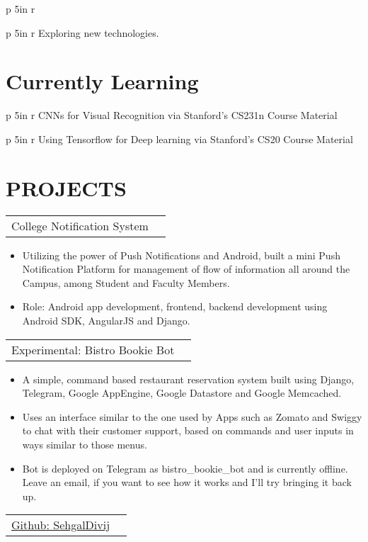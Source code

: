 \documentclass[margin]{res}
\begin{document}
\begin{resume}
\begin{tabular}{p {5in} r}
                    \end{tabular}
                \linebreak
                \begin{tabular}{p {5in} r}
                    Exploring new technologies.
                    \end{tabular}
\normalsize{\section{Currently Learning}}
		\begin{tabular}{p {5in} r}
                CNNs for Visual Recognition via Stanford's CS231n Course Material
                \end{tabular}
                \linebreak
                \begin{tabular}{p {5in} r}
                Using Tensorflow for Deep learning via Stanford's CS20 Course Material
                \end{tabular}
\section{PROJECTS}
		 \begin{tabular}{p{5in} r} %
                 College Notification System
                 \end{tabular}
                  \begin{itemize}
                   \item[] Utilizing the power of Push Notifications and Android, built a mini Push Notification Platform for management of flow of information all around the Campus, among Student and Faculty Members.
                   \item[] Role: Android app development, frontend, backend development using Android SDK, AngularJS and Django.
                  \end{itemize}
		\begin{tabular}{p{5in}r}
		 Experimental: Bistro Bookie Bot
		 \end{tabular}
		  \begin{itemize}
		   \item[] A simple, command based restaurant reservation system built using Django, Telegram, Google AppEngine, Google Datastore and Google Memcached.
		   \item[] Uses an interface similar to the one used by Apps such as Zomato and Swiggy to chat with their customer support, based on commands and user inputs in ways similar to those menus.
		   \item[] Bot is deployed on Telegram as bistro\_bookie\_bot and is currently offline. Leave an email, if you want to see how it works and I'll try bringing it back up.
		  \end{itemize}
		\begin{tabular}{p{5in} r} %
                 \href {http://www.github.com/SehgalDivij/} {Github: SehgalDivij}
                 \end{tabular}

\end{resume}
\end{document}
